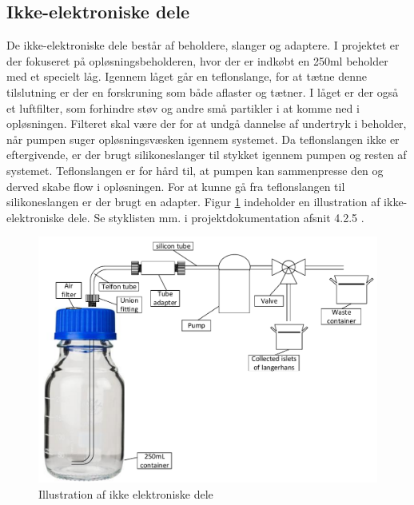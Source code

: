 \newpage
\subsection{Ikke-elektroniske dele}
De ikke-elektroniske dele består af beholdere, slanger og adaptere. I projektet er der fokuseret på opløsningsbeholderen, hvor der er indkøbt en 250ml beholder med et specielt låg. Igennem låget går en teflonslange, for at tætne denne tilslutning er der en forskruning som både aflaster og tætner. I låget er der også et luftfilter, som forhindre støv og andre små partikler i at komme ned i opløsningen. Filteret skal være der for at undgå dannelse af undertryk i beholder, når pumpen suger opløsningsvæsken igennem systemet. Da teflonslangen ikke er eftergivende, er der brugt silikoneslanger til stykket igennem pumpen og resten af systemet. Teflonslangen er for hård til, at pumpen kan sammenpresse den og derved skabe flow i opløsningen. For at kunne gå fra teflonslangen til silikoneslangen er der brugt en adapter. Figur \ref{fig:nonelectronic} indeholder en illustration af ikke-elektroniske dele. Se styklisten mm. i projektdokumentation afsnit 4.2.5 .

\begin{figure}[H]
	\centering
	\includegraphics[width=1\textwidth]{billeder/Hovedrapport/ikkeelektronisk.pdf}
	\caption{Illustration af ikke elektroniske dele}
	\label{fig:nonelectronic}
\end{figure}


